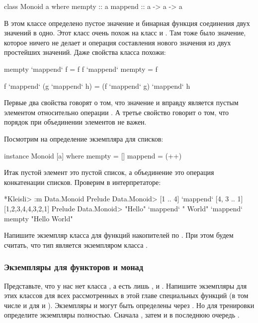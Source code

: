 \begin{code}
class Monoid a where
    mempty  :: a
    mappend :: a -> a -> a
\end{code}

В этом классе определено пустое значение 
и бинарная функция соединения двух значений в одно.
Этот класс очень похож на класс  и 
. Там тоже было значение, которое ничего не делает
и операция составления нового значения из двух простейших значений.
Даже свойства класса похожи:

\begin{code}
mempty  `mappend` f         = f
f       `mappend` mempty    = f

f `mappend` (g `mappend` h) =  (f `mappend` g) `mappend` h 
\end{code}


Первые два свойства говорят о том, что значение
 и вправду является пустым элементом относительно
операции . А третье свойство говорит о том, что
порядок при объединении элементов не важен.

Посмотрим на определение экземпляра для списков:

\begin{code}
instance Monoid [a] where
    mempty  = []
    mappend = (++)
\end{code}

Итак пустой элемент это пустой список, а объединение 
это операция конкатенации списков. Проверим в интерпретаторе:

\begin{code}
*Kleisli> :m Data.Monoid
Prelude Data.Monoid> [1 .. 4] `mappend` [4, 3 .. 1]
[1,2,3,4,4,3,2,1]
Prelude Data.Monoid> "Hello" `mappend` " World" `mappend` mempty
"Hello World"
\end{code}

Напишите экземпляр класса  для функций 
накопителей по . При этом будем считать, что тип  
является экземпляром класса .

\subsubsection{Экземпляры для функторов и монад}

Представьте, что у нас нет класса , а есть
лишь ,  и . Напишите экземпляры
для этих классов для всех рассмотренных в этой главе
специальных функций (в том числе и для  и ).
Экземпляры  и  могут быть определены
через . Но для тренировки определите экземпляры полностью. 
Сначала , затем  и в последнюю очередь
.

